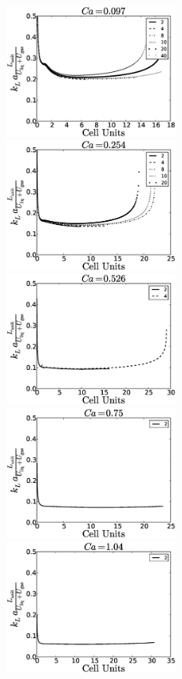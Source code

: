 \documentclass[preprint,12pt]{elsarticle}
\begin{document}
\begin{figure}[htb!]
\includegraphics[width=0.5\textwidth]{aver_conc_scale_ca097.eps}
\includegraphics[width=0.5\textwidth]{aver_conc_scale_ca054.eps}\\
\includegraphics[width=0.5\textwidth]{aver_conc_scale_ca026.eps}
\includegraphics[width=0.5\textwidth]{aver_conc_scale_ca05.eps}\\
\includegraphics[width=0.5\textwidth]{aver_conc_scale_ca14.eps}

\end{figure}
\end{document}
